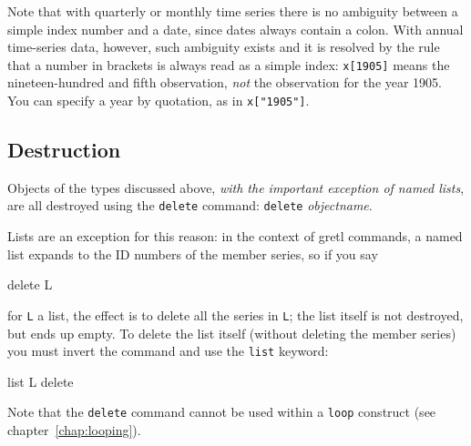 Note that with quarterly or monthly time series there is no ambiguity
between a simple index number and a date, since dates always contain a
colon. With annual time-series data, however, such ambiguity exists
and it is resolved by the rule that a number in brackets is always
read as a simple index: \texttt{x[1905]} means the nineteen-hundred
and fifth observation, \textit{not} the observation for the year 1905.
You can specify a year by quotation, as in \verb|x["1905"]|.

\subsection{Destruction}

Objects of the types discussed above, \textit{with the important
  exception of named lists}, are all destroyed using the
\texttt{delete} command: \texttt{delete} \textsl{objectname}.

Lists are an exception for this reason: in the context of gretl
commands, a named list expands to the ID numbers of the member series,
so if you say

\begin{code}
delete L
\end{code} 

for \texttt{L} a list, the effect is to delete all the series in
\texttt{L}; the list itself is not destroyed, but ends up empty.  To
delete the list itself (without deleting the member series) you must
invert the command and use the \texttt{list} keyword:

\begin{code}
list L delete
\end{code}

Note that the \texttt{delete} command cannot be used within a
\texttt{loop} construct (see chapter~\ref{chap:looping}).
